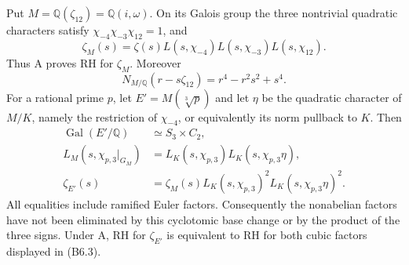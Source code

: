 \begin{proposition}
\label{AC-B06}
Put $M=\mathbb Q(\zeta_{12})=\mathbb Q(i,\omega)$.
On its Galois group the three nontrivial quadratic
characters satisfy $\chi_{-4}\chi_{-3}\chi_{12}=1$, and
\[
 \zeta_M(s)=\zeta(s)L(s,\chi_{-4})L(s,\chi_{-3})L(s,\chi_{12}).
                                                               \tag{B6.1}
\]
Thus A proves RH for $\zeta_M$. Moreover
\[
 N_{M/\mathbb Q}(r-s\zeta_{12})=r^4-r^2s^2+s^4.                \tag{B6.2}
\]
For a rational prime $p$, let $E'=M(\sqrt[3]p)$ and
let $\eta$ be the quadratic character of $M/K$, namely
the restriction of $\chi_{-4}$, or equivalently its
norm pullback to $K$. Then
\[
\begin{split}
 \operatorname{Gal}(E'/\mathbb Q)&\simeq S_3\times C_2,\\
 L_M(s,\chi_{p,3}|_{G_M})
       &=L_K(s,\chi_{p,3})L_K(s,\chi_{p,3}\eta),\\
 \zeta_{E'}(s)&=\zeta_M(s)
          L_K(s,\chi_{p,3})^2L_K(s,\chi_{p,3}\eta)^2.
\end{split}                                                \tag{B6.3}
\]
All equalities include ramified Euler factors. Consequently
the nonabelian factors have not been eliminated by this
cyclotomic base change or by the product of the three signs.
Under A, RH for $\zeta_{E'}$ is equivalent to RH for both
cubic factors displayed in (B6.3).
\end{proposition}
